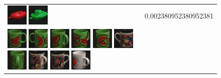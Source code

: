 \begin{figure}[tbp]
\begin{center}
\begin{tabular}{m{11cm} | m{3cm} |}
\includegraphics[width=1cm]{coil/beeld-21.eps} 
\includegraphics[width=1cm]{coil/beeld-57.eps} & {\scriptsize 
0.002380952380952381} \\ \includegraphics[width=1cm]{coil/beeld-30.eps} 
\includegraphics[width=1cm]{coil/beeld-31.eps} 
\includegraphics[width=1cm]{coil/beeld-34.eps} 
\includegraphics[width=1cm]{coil/beeld-33.eps} 
\includegraphics[width=1cm]{coil/beeld-32.eps} 
\includegraphics[width=1cm]{coil/beeld-61.eps} 
\includegraphics[width=1cm]{coil/beeld-35.eps} 
\includegraphics[width=1cm]{coil/beeld-64.eps} 
\includegraphics[width=1cm]{coil/beeld-60.eps} 
\includegraphics[width=1cm]{coil/beeld-40.eps} & {\scriptsize 
}
\end{tabular}
\end{center}
\end{figure}
